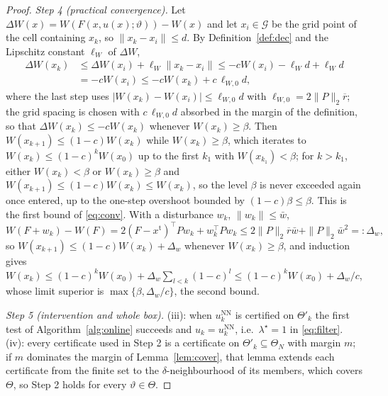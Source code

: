 \begin{proof}
\emph{Step 4 (practical convergence).} Let $\Delta W(x)=W(F(x,u(x);\vartheta))-W(x)$ and let $x_i\in\mathcal G$ be the grid point of the cell containing $x_k$, so $\|x_k-x_i\|\le d$. By Definition~\ref{def:dec} and the Lipschitz constant $\ell_W$ of $\Delta W$,
\begin{equation}\label{eq:dec1}
\begin{aligned}\Delta W(x_k)&\le\Delta W(x_i)+\ell_W\|x_k-x_i\|\le-cW(x_i)-\ell_Wd+\ell_Wd\\ &=-cW(x_i)\le-cW(x_k)+c\,\ell_{W,0}d,\end{aligned}
\end{equation}
where the last step uses $|W(x_k)-W(x_i)|\le\ell_{W,0}d$ with $\ell_{W,0}=2\|P\|_2\overline r$; the grid spacing is chosen with $c\,\ell_{W,0}d$ absorbed in the margin of the definition, so that $\Delta W(x_k)\le-cW(x_k)$ whenever $W(x_k)\ge\beta$. Then $W(x_{k+1})\le(1-c)W(x_k)$ while $W(x_k)\ge\beta$, which iterates to $W(x_k)\le(1-c)^kW(x_0)$ up to the first $k_1$ with $W(x_{k_1})<\beta$; for $k>k_1$, either $W(x_k)<\beta$ or $W(x_{k})\ge\beta$ and $W(x_{k+1})\le(1-c)W(x_k)\le W(x_k)$, so the level $\beta$ is never exceeded again once entered, up to the one-step overshoot bounded by $(1-c)\beta\le\beta$. This is the first bound of \eqref{eq:conv}. With a disturbance $w_k$, $\|w_k\|\le\bar w$,
\begin{equation}\label{eq:dec2}
W(F+w_k)-W(F)=2(F-x^{\mathrm t})^{\!\top}Pw_k+w_k^{\!\top}Pw_k\le2\|P\|_2\overline r\bar w+\|P\|_2\bar w^2=:\Delta_w,
\end{equation}
so $W(x_{k+1})\le(1-c)W(x_k)+\Delta_w$ whenever $W(x_k)\ge\beta$, and induction gives $W(x_k)\le(1-c)^kW(x_0)+\Delta_w\sum_{l<k}(1-c)^l\le(1-c)^kW(x_0)+\Delta_w/c$, whose limit superior is $\max\{\beta,\Delta_w/c\}$, the second bound.

\emph{Step 5 (intervention and whole box).} (iii): when $u^{\mathrm{NN}}_k$ is certified on $\Theta'_k$ the first test of Algorithm~\ref{alg:online} succeeds and $u_k=u^{\mathrm{NN}}_k$, i.e.\ $\lambda^\star=1$ in \eqref{eq:filter}. (iv): every certificate used in Step 2 is a certificate on $\Theta'_k\subseteq\Theta_N$ with margin $m$; if $m$ dominates the margin of Lemma~\ref{lem:cover}, that lemma extends each certificate from the finite set to the $\delta$-neighbourhood of its members, which covers $\Theta$, so Step 2 holds for every $\vartheta\in\Theta$.
\end{proof}

